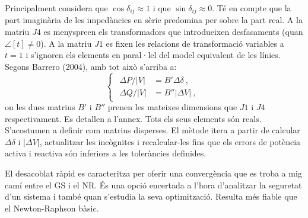 Principalment considera que $\cos \delta_{ij} \approx 1$ i que $\sin \delta_{ij} \approx 0$. Té en compte que la part imaginària de les impedàncies en sèrie predomina per sobre la part real. A la matriu $J4$ es menyspreen els transformadors que introdueixen desfasaments (quan $\angle[t]\neq 0$). A la matriu $J1$ es fixen les relacions de transformació variables a $t=1$ i s'ignoren els elements en paral·lel del model equivalent de les línies. Segons Barrero (2004), amb tot això s'arriba a:
\begin{equation}
    \begin{cases}
    \begin{split}
        \Delta P/|V|&=B'\Delta \delta\ ,\\
        \Delta Q/|V|&=B''|\Delta V|\ ,
    \end{split}
\end{cases}
    \label{eq:FDLF2}
\end{equation}
on les dues matrius $B'$ i $B''$ prenen les mateixes dimensions que $J1$ i $J4$ respectivament. Es detallen a l'annex. Tots els seus elements són reals. S'acostumen a definir com matrius disperses. El mètode itera a partir de calcular $\Delta \delta$ i $|\Delta V|$, actualitzar les incògnites i recalcular-les fins que els errors de potència activa i reactiva són inferiors a les toleràncies definides.

El desacoblat ràpid es caracteritza per oferir una convergència que es troba a mig camí entre el GS i el NR. És una opció encertada a l'hora d'analitzar la seguretat d'un sistema i també quan s'estudia la seva optimització. Resulta més fiable que el Newton-Raphson bàsic. 